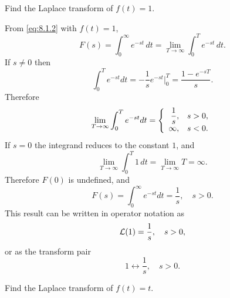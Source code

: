 
\begin{example}
  \label{example:8.1.1}\rm Find the Laplace transform of $f(t)=1$.
\end{example}

\begin{examplesolution}
\solution From \eqref{eq:8.1.2} with $f(t)=1$,
\[
  F(s)=\int_{0}^{\infty}e^{-st}\,dt=\lim_{T\to\infty}\int_{0}^{T}e^{-st}\, dt.
\]
If $s\ne0$ then
\begin{equation}
  \label{eq:8.1.3}\int_{0}^{T}e^{-st}dt=-\frac{1}{s}e^{-st}\Big|_{0}^{T}=\frac{1-e^{-sT}}{s}.
\end{equation}
Therefore
\begin{equation}
  \label{eq:8.1.4}\lim_{T\to\infty}\int_{0}^{T}e^{-st}dt=\left\{
  \begin{array}{rr}
    \displaystyle\frac{1}{s}, & s>0, \\
    \infty,          & s<0.
  \end{array}\right.
\end{equation}
If $s=0$ the integrand reduces to the constant $1$, and
\[
  \lim_{T\to\infty}\int_{0}^{T}1\,dt= \lim_{T\to\infty}T=\infty.
\]
Therefore $F(0)$ is undefined, and
\[
  F(s)=\int_{0}^{\infty}e^{-st}dt=\frac{1}{s},\quad s>0.
\]
This result can be written in operator notation as
\[
  {\cal L}(1)=\frac{1}{s},\quad s>0,
\]
or as the transform pair
\[
  1\leftrightarrow\frac{1}{s},\quad s>0.
\]

\color{blue}
\color{black}
\end{examplesolution}

\begin{example}
  \label{example:8.1.2}\rm Find the Laplace transform of $f(t)=t$.
\end{example}

